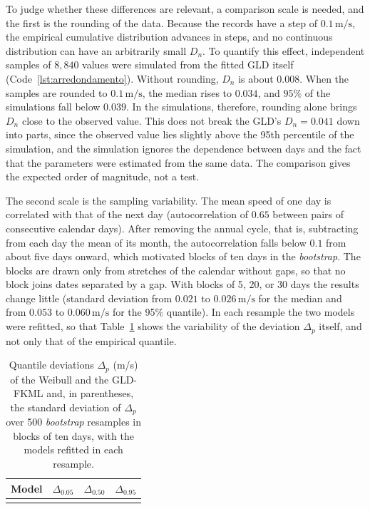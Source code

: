 To judge whether these differences are relevant, a comparison scale is needed, and the first is the rounding of the data. Because the records have a step of $0.1\,\text{m/s}$, the empirical cumulative distribution advances in steps, and no continuous distribution can have an arbitrarily small $D_n$. To quantify this effect, independent samples of $8{,}840$ values were simulated from the fitted GLD itself (Code~\ref{lst:arredondamento}). Without rounding, $D_n$ is about $0.008$. When the samples are rounded to $0.1\,\text{m/s}$, the median rises to $0.034$, and $95\%$ of the simulations fall below $0.039$. In the simulations, therefore, rounding alone brings $D_n$ close to the observed value. This does not break the GLD's $D_n = 0.041$ down into parts, since the observed value lies slightly above the 95th percentile of the simulation, and the simulation ignores the dependence between days and the fact that the parameters were estimated from the same data. The comparison gives the expected order of magnitude, not a test.

The second scale is the sampling variability. The mean speed of one day is correlated with that of the next day (autocorrelation of $0.65$ between pairs of consecutive calendar days). After removing the annual cycle, that is, subtracting from each day the mean of its month, the autocorrelation falls below $0.1$ from about five days onward, which motivated blocks of ten days in the \textit{bootstrap}. The blocks are drawn only from stretches of the calendar without gaps, so that no block joins dates separated by a gap. With blocks of 5, 20, or 30 days the results change little (standard deviation from $0.021$ to $0.026\,\text{m/s}$ for the median and from $0.053$ to $0.060\,\text{m/s}$ for the 95\% quantile). In each resample the two models were refitted, so that Table~\ref{tab:incerteza_vento} shows the variability of the deviation $\Delta_p$ itself, and not only that of the empirical quantile.\par



\begin{table}[htbp]
\centering
\caption{Quantile deviations $\Delta_p$ (m/s) of the Weibull and the GLD-FKML and, in parentheses, the standard deviation of $\Delta_p$ over 500 \textit{bootstrap} resamples in blocks of ten days, with the models refitted in each resample.}
\label{tab:incerteza_vento}
\begin{tabular}{lccc}
\toprule
\textbf{Model} & \textbf{$\Delta_{0.05}$} & \textbf{$\Delta_{0.50}$} & \textbf{$\Delta_{0.95}$} \\
\midrule
\unskip \\
\bottomrule
\end{tabular}
\end{table}

